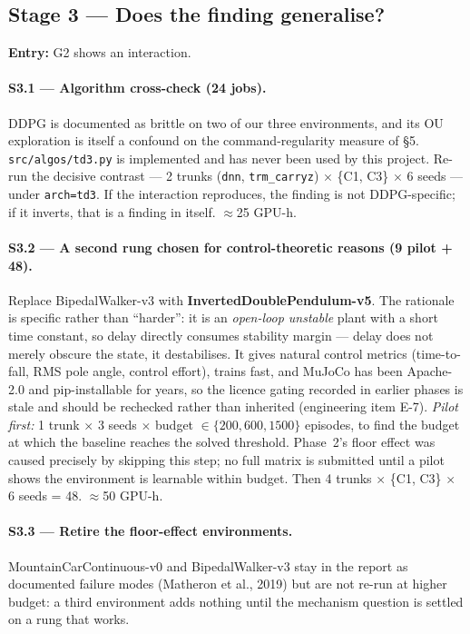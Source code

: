 \documentclass[11pt]{article}
\newcommand{\code}[1]{\texttt{\small #1}}
\begin{document}
\subsection{Stage 3 --- Does the finding generalise?}

\textbf{Entry:} G2 shows an interaction.

\paragraph{S3.1 --- Algorithm cross-check (24 jobs).} DDPG is documented as brittle on two of our three environments, and its OU exploration is itself a confound on the command-regularity measure of \S5. \code{src/algos/td3.py} is implemented and has never been used by this project. Re-run the decisive contrast --- 2 trunks (\code{dnn}, \code{trm\_carryz}) $\times$ \{C1, C3\} $\times$ 6 seeds --- under \code{arch=td3}. If the interaction reproduces, the finding is not DDPG-specific; if it inverts, that is a finding in itself. $\approx$25 GPU-h.

\paragraph{S3.2 --- A second rung chosen for control-theoretic reasons (9 pilot + 48).} Replace BipedalWalker-v3 with \textbf{InvertedDoublePendulum-v5}. The rationale is specific rather than ``harder'': it is an \emph{open-loop unstable} plant with a short time constant, so delay directly consumes stability margin --- delay does not merely obscure the state, it destabilises. It gives natural control metrics (time-to-fall, RMS pole angle, control effort), trains fast, and MuJoCo has been Apache-2.0 and pip-installable for years, so the licence gating recorded in earlier phases is stale and should be rechecked rather than inherited (engineering item E-7). \emph{Pilot first:} 1 trunk $\times$ 3 seeds $\times$ budget $\in \{200, 600, 1500\}$ episodes, to find the budget at which the baseline reaches the solved threshold. Phase~2's floor effect was caused precisely by skipping this step; no full matrix is submitted until a pilot shows the environment is learnable within budget. Then 4 trunks $\times$ \{C1, C3\} $\times$ 6 seeds = 48. $\approx$50 GPU-h.

\paragraph{S3.3 --- Retire the floor-effect environments.} MountainCarContinuous-v0 and BipedalWalker-v3 stay in the report as documented failure modes (Matheron et al., 2019) but are not re-run at higher budget: a third environment adds nothing until the mechanism question is settled on a rung that works.
\end{document}
